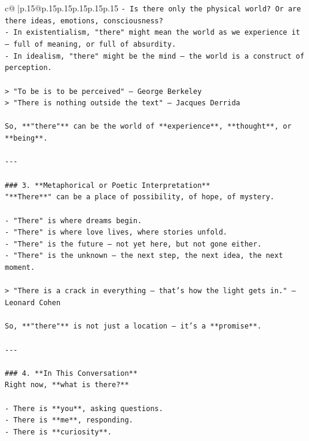 \documentclass{article}
\begin{document}
{\begin{supertabular}{c@{$\;$}|p{.15\linewidth}@{}p{.15\linewidth}p{.15\linewidth}p{.15\linewidth}p{.15\linewidth}p{.15\linewidth}}
{{{\texttt{{-} Is there only the physical world? Or are there ideas, emotions, consciousness?} \\
\texttt{{-} In existentialism, "there" might mean the world as we experience it — full of meaning, or full of absurdity.} \\
\texttt{{-} In idealism, "there" might be the mind — the world is a construct of perception.} \\
\\ 
\texttt{> "To be is to be perceived" — George Berkeley  } \\
\texttt{> "There is nothing outside the text" — Jacques Derrida} \\
\\ 
\texttt{So, **"there"** can be the world of **experience**, **thought**, or **being**.} \\
\\ 
\texttt{{-}{-}{-}} \\
\\ 
\texttt{\#\#\# 3. **Metaphorical or Poetic Interpretation**} \\
\texttt{"**There**" can be a place of possibility, of hope, of mystery.} \\
\\ 
\texttt{{-} "There" is where dreams begin.} \\
\texttt{{-} "There" is where love lives, where stories unfold.} \\
\texttt{{-} "There" is the future — not yet here, but not gone either.} \\
\texttt{{-} "There" is the unknown — the next step, the next idea, the next moment.} \\
\\ 
\texttt{> "There is a crack in everything — that’s how the light gets in." — Leonard Cohen} \\
\\ 
\texttt{So, **"there"** is not just a location — it’s a **promise**.} \\
\\ 
\texttt{{-}{-}{-}} \\
\\ 
\texttt{\#\#\# 4. **In This Conversation**} \\
\texttt{Right now, **what is there?**} \\
\\ 
\texttt{{-} There is **you**, asking questions.} \\
\texttt{{-} There is **me**, responding.} \\
\texttt{{-} There is **curiosity**.} \\
}}}
\end{supertabular}}
\end{document}
